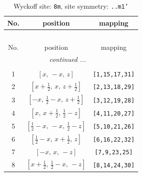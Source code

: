 \documentclass[fleqn,8pt]{jsarticle}
\begin{document}
\begin{longtable}{ccc}
\caption{Wyckoff site: {\tt 8m}, site symmetry: {\tt ..m1'}}
 \\
 \hline \hline
No. & position & mapping \\ \hline \endfirsthead

\multicolumn{2}{l}{\tablename\ \thetable{}} \\
 \hline \hline
No. & position & mapping \\ \hline \endhead

 \hline \hline
\multicolumn{2}{r}{\footnotesize\it continued ...} \\ \endfoot

 \hline \hline
\multicolumn{2}{r}{} \\ \endlastfoot

1 & $\left[ x,\, - x,\, z \right]$ & {\tt [1,15,17,31]} \\ \hline
2 & $\left[ x + \frac{1}{2},\, x,\, z + \frac{1}{2} \right]$ & {\tt [2,13,18,29]} \\ \hline
3 & $\left[ - x,\, \frac{1}{2} - x,\, z + \frac{1}{2} \right]$ & {\tt [3,12,19,28]} \\ \hline
4 & $\left[ x,\, x + \frac{1}{2},\, \frac{1}{2} - z \right]$ & {\tt [4,11,20,27]} \\ \hline
5 & $\left[ \frac{1}{2} - x,\, - x,\, \frac{1}{2} - z \right]$ & {\tt [5,10,21,26]} \\ \hline
6 & $\left[ \frac{1}{2} - x,\, x + \frac{1}{2},\, z \right]$ & {\tt [6,16,22,32]} \\ \hline
7 & $\left[ - x,\, x,\, - z \right]$ & {\tt [7,9,23,25]} \\ \hline
8 & $\left[ x + \frac{1}{2},\, \frac{1}{2} - x,\, - z \right]$ & {\tt [8,14,24,30]} \\
\end{longtable}
\renewcommand{\arraystretch}{1.2}
\end{document}
